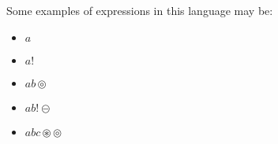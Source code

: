 \documentclass{article}
\begin{document}
Some examples of expressions in this language may be:

\begin{itemize}
    \item $a$
    \item $a!$
    \item $ab\circledcirc$
    \item $ab!\circleddash$
    \item $abc\circledast\circledcirc$
\end{itemize}
\end{document}
